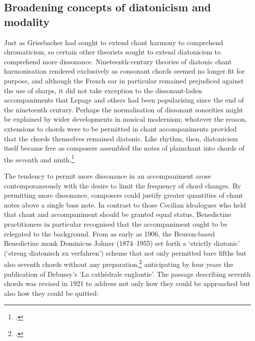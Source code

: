 \subsection{Broadening concepts of diatonicism and modality}
Just as Griesbacher had sought to extend chant harmony to comprehend chromaticism, so certain other theorists sought to extend diatonicism to comprehend more dissonance.
Nineteenth-century theories of diatonic chant harmonisation rendered exclusively as consonant chords seemed no longer fit for purpose, and although the French ear in particular remained prejudiced against the use of sharps, it did not take exception to the dissonant-laden accompaniments that Lepage and others had been popularising since the end of the nineteenth century.
Perhaps the normalisation of dissonant sonorities might be explained by wider developments in musical modernism; whatever the reason, extensions to chords were to be permitted in chant accompaniments provided that the chords themselves remained diatonic.
Like rhythm, then, diatonicism itself became free as composers assembled the notes of plainchant into chords of the seventh and ninth.\footcite[359, 363]{Lessmannanachronismemusicalaccompagnement2019}

The tendency to permit more dissonance in an accompaniment arose contemporaneously with the desire to limit the frequency of chord changes.
By permitting more dissonance, composers could justify greater quantities of chant notes above a single bass note.
In contrast to those Cecilian idealogues who held that chant and accompaniment should be granted equal status, Benedictine practitioners in particular recognised that the accompaniment ought to be relegated to the background.
%
From as early as 1906, the Beuron-based Benedictine monk Dominicus Johner (1874--1955) set forth a `strictly diatonic' (`streng diatonisch zu verfahren') scheme that not only permitted bare fifths but also seventh chords without any preparation,\footnote{\cite[207]{JohnerNeueSchulegregorianischen1906}.\label{fn:johner_firstedn}} anticipating by four years the publication of Debussy's `La cathédrale engloutie'.
The passage describing seventh chords was revised in 1921 to address not only how they could be approached but also how they could be quitted:

